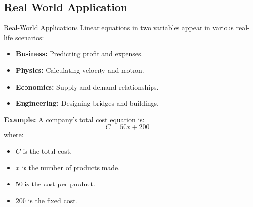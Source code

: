 \documentclass{beamer}
\begin{document}
\begin{frame}
\section{Real World Application}
\end{frame}


\begin{frame}{Real-World Applications}
    Linear equations in two variables appear in various real-life scenarios:

    \begin{itemize}
        \item \textbf{Business:} Predicting profit and expenses.
        \item \textbf{Physics:} Calculating velocity and motion.
        \item \textbf{Economics:} Supply and demand relationships.
        \item \textbf{Engineering:} Designing bridges and buildings.
    \end{itemize}

    \vspace{0.5cm}
    \textbf{Example:}  
    A company's total cost equation is:
    \[
    C = 50x + 200
    \]
    where:
    \begin{itemize}
        \item \( C \) is the total cost.
        \item \( x \) is the number of products made.
        \item \( 50 \) is the cost per product.
        \item \( 200 \) is the fixed cost.
    \end{itemize}
\end{frame}
\end{document}
